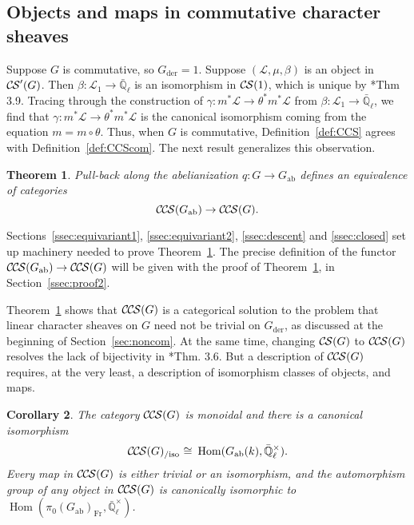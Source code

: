 \documentclass[10pt]{amsart}
\theoremstyle{plain}
\newtheorem{theorem}{Theorem}[section]
\newtheorem{corollary}[theorem]{Corollary}
\theoremstyle{definition}
\newcommand{\EE}{\mathbb{\bar Q}_\ell}
\newcommand{\Fq}{k}
\newcommand{\EEx}{\EE^\times}
\newcommand{\Frob}[1]{\operatorname{Fr}_{#1}}
\DeclareMathOperator{\Hom}{Hom}
\newcommand{\der}{_{\operatorname{der}}}
\newcommand{\ab}{_{\operatorname{ab}}}
\newcommand{\iso}{{\ \cong\ }}
\newcommand{\cs}[1]{{\mathcal{#1}}}
\newcommand{\CS}{{\mathcal{C\hskip-0.8pt S}}}
\newcommand{\CCS}{{\mathcal{C\hskip-.8pt C\hskip-0.8pt S}}}
\newcommand{\CCSiso}[1]{\CCS(#1)_{/\text{iso}}}
\begin{document}
\subsection{Objects and maps in commutative character sheaves} \label{ssec:obmor}

Suppose $G$ is commutative, so $G\der = 1$. 
Suppose $(\cs{L},\mu,\beta)$ is an object in $\CS'(G)$.
Then $\beta : \cs{L}_1\to \EE$ is an isomorphism in $\CS(1)$, which is unique by \cite{cunningham-roe:13a}*{Thm 3.9}.
Tracing through the construction of $\gamma : m^*\cs{L} \to \theta^*m^*\cs{L}$ from $\beta : \cs{L}_1\to \EE$, we find 
that $\gamma : m^*\cs{L} \to \theta^*m^*\cs{L}$ is the canonical isomorphism coming from the equation $m = m \circ \theta$. 
Thus, when $G$ is commutative, Definition~\ref{def:CCS} agrees with Definition~\ref{def:CCScom}.
The next result generalizes this observation.


\begin{theorem}\label{thm:Gab}
Pull-back along the abelianization $q : G \to G\ab$
defines an equivalence of categories
\[
\CCS(G\ab) \to \CCS(G).
\]
\end{theorem}
%
Sections~\ref{ssec:equivariant1}, \ref{ssec:equivariant2}, \ref{ssec:descent} and \ref{ssec:closed} set up machinery needed to prove Theorem~\ref{thm:Gab}.
The precise definition of the functor $\CCS(G\ab) \to \CCS(G)$ will be given with the proof of Theorem~\ref{thm:Gab}, in Section~\ref{ssec:proof2}.

Theorem~\ref{thm:Gab} shows that $\CCS(G)$ is a categorical solution to the problem that linear character sheaves on $G$ need not be trivial on $G\der$, as discussed at the beginning of Section~\ref{sec:noncom}.  At the same time, changing $\CS(G)$ to $\CCS(G)$ resolves the lack of bijectivity in \cite{cunningham-roe:13a}*{Thm. 3.6}.
%
But a description of $\CCS(G)$ requires, at the very least, a description of isomorphism classes of objects, and maps. 

\begin{corollary}\label{cor:Gab}
The category $\CCS(G)$ is monoidal and there is a canonical isomorphism
\[
\CCSiso{G} \iso \Hom(G\ab(\Fq),\EEx).
\]
Every map in $\CCS(G)$ is either trivial or an isomorphism, and the automorphism group of any object in $\CCS(G)$ is canonically
isomorphic to $\Hom(\pi_0(G\ab)_{\Frob{}},\EEx)$.
\end{corollary}
\end{document}
